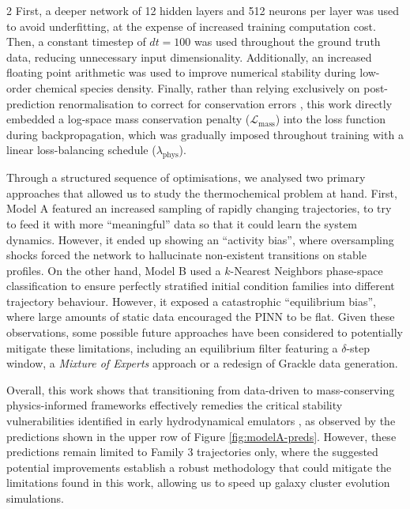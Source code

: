 \documentclass[10pt,a4paper]{article}
\begin{document}
\begin{multicols}{2}
First, a deeper network of 12 hidden layers and 512 neurons per layer was used to avoid underfitting, at the expense of increased training computation cost. Then, a constant timestep of $dt = 100$ was used throughout the ground truth data, reducing unnecessary input dimensionality. Additionally, an increased floating point arithmetic was used to improve numerical stability during low-order chemical species density. Finally, rather than relying exclusively on post-prediction renormalisation to correct for conservation errors \cite{bourrat2026}, this work directly embedded a log-space mass conservation penalty ($\mathcal{L}_{\text{mass}}$) into the loss function during backpropagation, which was gradually imposed throughout training with a linear loss-balancing schedule ($\lambda_{\text{phys}}$).

Through a structured sequence of optimisations, we analysed two primary approaches that allowed us to study the thermochemical problem at hand. First, Model A featured an increased sampling of rapidly changing trajectories, to try to feed it with more ``meaningful'' data so that it could learn the system dynamics. However, it ended up showing an ``activity bias'', where oversampling shocks forced the network to hallucinate non-existent transitions on stable profiles. On the other hand, Model B used a $k$-Nearest Neighbors phase-space classification to ensure perfectly stratified initial condition families into different trajectory behaviour. However, it exposed a catastrophic ``equilibrium bias'', where large amounts of static data encouraged the PINN to be flat. Given these observations, some possible future approaches have been considered to potentially mitigate these limitations, including an equilibrium filter featuring a $\delta$-step window, a \textit{Mixture of Experts} approach or a redesign of Grackle data generation.

Overall, this work shows that transitioning from data-driven to mass-conserving physics-informed frameworks effectively remedies the critical stability vulnerabilities identified in early hydrodynamical emulators \cite{bourrat2026}, as observed by the predictions shown in the upper row of Figure \ref{fig:modelA-preds}. However, these predictions remain limited to Family 3 trajectories only, where the suggested potential improvements establish a robust methodology that could mitigate the limitations found in this work, allowing us to speed up galaxy cluster evolution simulations.





\end{multicols}
\end{document}
